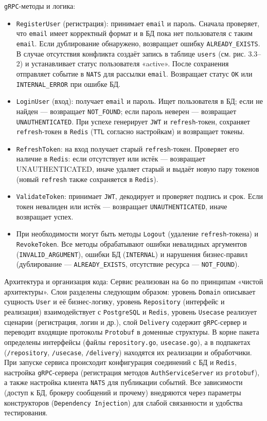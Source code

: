 \texttt{gRPC}-методы и логика:
\begin{itemize}
    \item \texttt{RegisterUser} (регистрация): принимает \texttt{email} и пароль. Сначала проверяет, что \texttt{email} имеет корректный формат и в БД пока нет пользователя с таким \texttt{email}. Если дублирование обнаружено, возвращает ошибку \texttt{ALREADY\_EXISTS}. В случае отсутствия конфликта создаёт запись в таблице \texttt{users} (см. рис. 3.3–2) и устанавливает статус пользователя «active». После сохранения отправляет событие в \texttt{NATS} для рассылки \texttt{email}. Возвращает статус \texttt{OK} или \texttt{INTERNAL\_ERROR} при ошибке БД.
    \item \texttt{LoginUser} (вход): получает \texttt{email} и пароль. Ищет пользователя в БД; если не найден — возвращает \texttt{NOT\_FOUND}; если пароль неверен — возвращает \texttt{UNAUTHENTICATED}. При успехе генерирует \texttt{JWT} и \texttt{refresh}-токен, сохраняет \texttt{refresh}-токен в \texttt{Redis} (\texttt{TTL} согласно настройкам) и возвращает токены.
    \item \texttt{RefreshToken}: на вход получает старый \texttt{refresh}-токен. Проверяет его наличие в \texttt{Redis}: если отсутствует или истёк — возвращает \\ UNAUTHENTICATED, иначе удаляет старый и выдаёт новую пару токенов (новый \texttt{refresh} также сохраняется в \texttt{Redis}).
    \item \texttt{ValidateToken}: принимает \texttt{JWT}, декодирует и проверяет подпись и срок. Если токен невалиден или истёк — возвращает \texttt{UNAUTHENTICATED}, иначе возвращает успех.
    \item При необходимости могут быть методы \texttt{Logout} (удаление \texttt{refresh}-токена) и \texttt{RevokeToken}. Все методы обрабатывают ошибки невалидных аргументов (\texttt{INVALID\_ARGUMENT}), ошибки БД (\texttt{INTERNAL}) и нарушения бизнес-правил (дублирование — \texttt{ALREADY\_EXISTS}, отсутствие ресурса — \texttt{NOT\_FOUND}).
\end{itemize}
Архитектура и организация кода: Сервис реализован на \texttt{Go} по принципам «чистой архитектуры». Слои разделены следующим образом: уровень \texttt{Domain} описывает сущность \texttt{User} и её бизнес-логику, уровень \texttt{Repository} (интерфейс и реализация) взаимодействует с \texttt{PostgreSQL} и \texttt{Redis}, уровень \texttt{Usecase} реализует сценарии (регистрация, логин и др.), слой \texttt{Delivery} содержит \texttt{gRPC}-сервер и переводит входящие протоколы \texttt{Protobuf} в доменные структуры. В корне пакета определены интерфейсы (файлы \texttt{repository.go}, \texttt{usecase.go}), а в подпакетах (\texttt{/repository}, \texttt{/usecase}, \texttt{/delivery}) находятся их реализации и обработчики. При запуске сервиса происходит конфигурация соединений с БД и \texttt{Redis}, настройка \texttt{gRPC}-сервера (регистрация методов \texttt{AuthServiceServer} из \texttt{protobuf}), а также настройка клиента \texttt{NATS} для публикации событий. Все зависимости (доступ к БД, брокеру сообщений и прочему) внедряются через параметры конструкторов (\texttt{Dependency Injection}) для слабой связанности и удобства тестирования.

